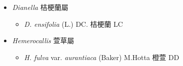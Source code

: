 
  \begin{itemize}
 \item[] \textit{Dianella} 桔梗蘭屬
                                
  \begin{itemize}
        \item[] \textit{D. ensifolia} (L.) DC.  桔梗蘭   LC
  \end{itemize}
 \item[] \textit{Hemerocallis} 萱草屬
                                
  \begin{itemize}
        \item[] \textit{H. fulva} var. \textit{aurantiaca} (Baker) M.Hotta  橙萱   DD
  \end{itemize}
  \end{itemize}
